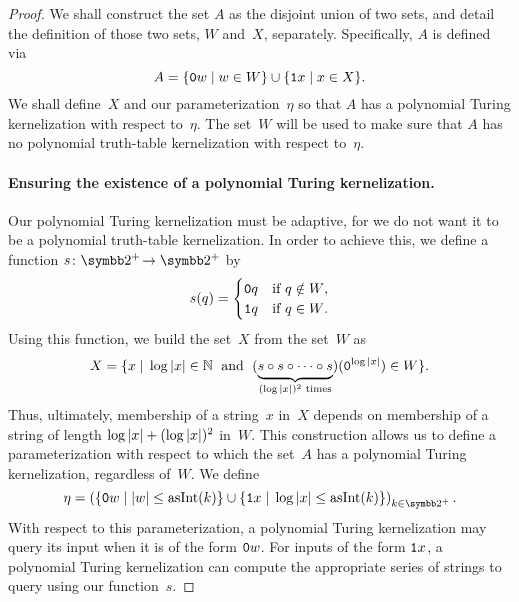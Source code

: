 \begin{proof}
  We shall construct the set $A$ as the disjoint union of two sets, and detail the definition of those two sets, $W$ and~$X$, separately.
  Specifically, $A$ is defined via
  \begin{equation*}
    A = \{\textnormal{\texttt{0}}w \;|\; w \in W\} \cup \{\textnormal{\texttt{1}}x \;|\; x \in X\}.
  \end{equation*}
  We shall define~$X$ and our parameterization~$\eta$ so that $A$ has a polynomial Turing kernelization with respect to~$\eta$.
  The set~$W$ will be used to make sure that $A$ has no polynomial truth-table kernelization with respect to~$\eta$.

  \paragraph{Ensuring the existence of a polynomial Turing kernelization.}
  Our polynomial Turing kernelization must be adaptive, for we do not want it to be a polynomial truth-table kernelization.
  In order to achieve this, we define a function $s\colon \binary^+\! \to \binary^+$ by
  \begin{equation*}
    s(q) = \begin{cases}
      \textnormal{\texttt{0}}q	& \text{if $q \notin W$}, \\
      \textnormal{\texttt{1}}q	& \text{if $q \in W$}.
    \end{cases}
  \end{equation*}
  Using this function, we build the set~$X$ from the set~$W$ as
  \begin{equation*}
    X = \{x \;|\; \log{\lvert x\rvert} \in \mathbb{N} \;\text{ and }\; (\underbrace{\vphantom{()}s \circ s \circ \cdots \circ s}_{(\log{\lvert x\rvert})^2\text{ times}})(\textnormal{\texttt{0}}^{\log{\lvert x\rvert}}) \in W\}.
  \end{equation*}
  Thus, ultimately, membership of a string~$x$ in~$X$ depends on membership of a string of length $\log{\lvert x\rvert} + (\log{\lvert x\rvert})^2$ in~$W$.
  This construction allows us to define a parameterization with respect to which the set~$A$ has a polynomial Turing kernelization, regardless of~$W$.
  We define
  \begin{equation*}
    \eta \deq \left(\{\bits{0}w \st \length{w} \le \asNat(k)\} \cup \{\bits{1}x \st \log\length{x} \le \asNat(k)\}\right)_{k \in \binary^+}.
  \end{equation*}
  With respect to this parameterization, a polynomial Turing kernelization may query its input when it is of the form $\textnormal{\texttt{0}}w$.
  For inputs of the form $\textnormal{\texttt{1}}x$, a polynomial Turing kernelization can compute the appropriate series of strings to query using our function~$s$.

\end{proof}
